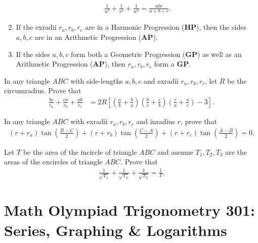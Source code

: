 \begin{tcolorbox}
\begin{question}[name={Makshud's Excentral Identities}]
\begin{enumerate}
        \begin{align*}
            \frac{1}{u^2}+\frac{1}{v^2}+\frac{1}{w^2}=\frac{abc}{a+b+c}.
        \end{align*}
        \item If the exradii $r_a,r_b,r_c$ are in a Harmonic Progression (\textbf{HP}), then the sides $a,b,c$ are in an Arithmetic Progression (\textbf{AP}).
        \item If the sides $a,b,c$ form both a Geometric Progression (\textbf{GP}) as well as an Arithmetic Progression (\textbf{AP}), then $r_a,r_b,r_c$ form a \textbf{GP}.
        \end{enumerate}
\end{question}
\end{tcolorbox}


\begin{question}
    In any triangle $ABC$ with side-lengths $a,b,c$ and exradii $r_a,r_b,r_c$, let $R$ be the circumradius. Prove that
    \begin{align*}
        \frac{bc}{r_a}+\frac{ca}{r_b}+\frac{ab}{r_c} &= 2R\left[\left( \frac ab+ \frac ba\right)\left( \frac bc+ \frac cb\right)\left( \frac ca+ \frac ac\right)-3\right].
    \end{align*}
\end{question}

\begin{question}
    In any triangle $ABC$ with exradii $r_a,r_b,r_c$ and inradius $r$, prove that
    \begin{align*}
        (r+r_a)\tan\left(\frac{B-C}{2}\right)+(r+r_b)\tan\left(\frac{C-A}{2}\right)+(r+r_c)\tan\left(\frac{A-B}{2}\right)=0.
    \end{align*}
\end{question}

\begin{question}
    Let $T$ be the area of the incircle of triangle $ABC$ and assume $T_1,T_2,T_3$ are the areas of the excircles of triangle $ABC$. Prove that
    \begin{align*}
        \frac{1}{\sqrt{T_1}}+\frac{1}{\sqrt{T_2}}+\frac{1}{\sqrt{T_3}}=\frac{1}{T}.
    \end{align*}
\end{question}

\newpage
\section{Math Olympiad Trigonometry 301:\\ Series, Graphing \& Logarithms}

